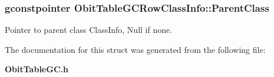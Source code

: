\subsubsection{\setlength{\rightskip}{0pt plus 5cm}gconstpointer {\bf Obit\-Table\-GCRow\-Class\-Info::Parent\-Class}}\label{structObitTableGCRowClassInfo_o3}


Pointer to parent class Class\-Info, Null if none. 



The documentation for this struct was generated from the following file:\begin{CompactItemize}
\item 
{\bf Obit\-Table\-GC.h}\end{CompactItemize}
